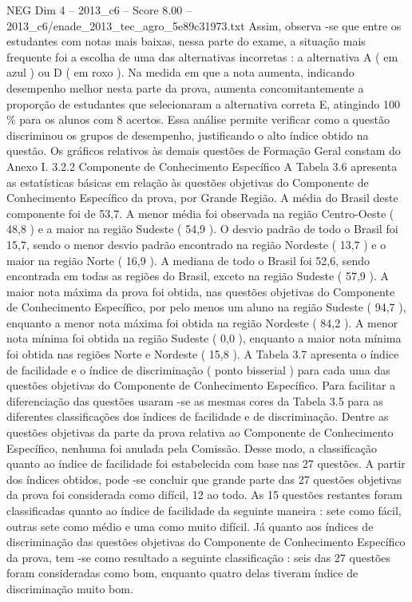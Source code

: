 \begin{textsample}{NEG Dim 4 – 2013\_c6 – Score 8.00 – 2013\_c6/enade\_2013\_tec\_agro\_5e89c31973.txt}
Assim, observa -se que entre os estudantes com notas mais baixas, nessa parte do exame, a situação mais frequente foi a escolha de uma das alternativas incorretas : a alternativa A ( em azul ) ou D ( em roxo ).
Na medida em que a nota aumenta, indicando desempenho melhor nesta parte da prova, aumenta concomitantemente a proporção de estudantes que selecionaram a alternativa correta E, atingindo 100 \% para os alunos com 8 acertos.
Essa análise permite verificar como a questão discriminou os grupos de desempenho, justificando o alto índice obtido na questão.
Os gráficos relativos às demais questões de Formação Geral constam do Anexo I. 3.2.2 Componente de Conhecimento Específico A Tabela 3.6 apresenta as estatísticas básicas em relação às questões objetivas do Componente de Conhecimento Específico da prova, por Grande Região.
A média do Brasil deste componente foi de 53,7.
A menor média foi observada na região Centro-Oeste ( 48,8 ) e a maior na região Sudeste ( 54,9 ).
O desvio padrão de todo o Brasil foi 15,7, sendo o menor desvio padrão encontrado na região Nordeste ( 13,7 ) e o maior na região Norte ( 16,9 ).
A mediana de todo o Brasil foi 52,6, sendo encontrada em todas as regiões do Brasil, exceto na região Sudeste ( 57,9 ).
A maior nota máxima da prova foi obtida, nas questões objetivas do Componente de Conhecimento Específico, por pelo menos um aluno na região Sudeste ( 94,7 ), enquanto a menor nota máxima foi obtida na região Nordeste ( 84,2 ).
A menor nota mínima foi obtida na região Sudeste ( 0,0 ), enquanto a maior nota mínima foi obtida nas regiões Norte e Nordeste ( 15,8 ).
A Tabela 3.7 apresenta o índice de facilidade e o índice de discriminação ( ponto bisserial ) para cada uma das questões objetivas do Componente de Conhecimento Específico.
Para facilitar a diferenciação das questões usaram -se as mesmas cores da Tabela 3.5 para as diferentes classificações dos índices de facilidade e de discriminação.
Dentre as questões objetivas da parte da prova relativa ao Componente de Conhecimento Específico, nenhuma foi anulada pela Comissão.
Desse modo, a classificação quanto ao índice de facilidade foi estabelecida com base nas 27 questões.
A partir dos índices obtidos, pode -se concluir que grande parte das 27 questões objetivas da prova foi considerada como difícil, 12 ao todo.
As 15 questões restantes foram classificadas quanto ao índice de facilidade da seguinte maneira : sete como fácil, outras sete como médio e uma como muito difícil.
Já quanto aos índices de discriminação das questões objetivas do Componente de Conhecimento Específico da prova, tem -se como resultado a seguinte classificação : seis das 27 questões foram consideradas como bom, enquanto quatro delas tiveram índice de discriminação muito bom.

\end{textsample}

